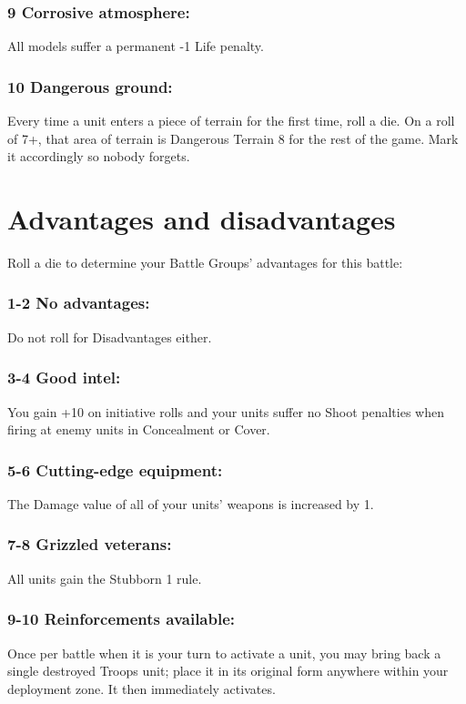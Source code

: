 \begin{multicols}{2}
\subsubsection*{9 Corrosive atmosphere:} All models suffer a permanent -1 Life penalty.

\subsubsection*{10 Dangerous ground:} Every time a unit enters a piece of terrain for the first time, roll a die. On a roll of 7+, that area of terrain is Dangerous Terrain 8 for the rest of the game. Mark it accordingly so nobody forgets.




\section*{Advantages and disadvantages}
Roll a die to determine your Battle Groups' advantages for this battle:
\subsubsection*{1-2 No advantages:} Do not roll for Disadvantages either.

\subsubsection*{3-4 Good intel:} You gain +10 on initiative rolls and your units suffer no Shoot penalties when firing at enemy units in Concealment or Cover.

\subsubsection*{5-6 Cutting-edge equipment:} The Damage value of all of your units' weapons is increased by 1.

\subsubsection*{7-8 Grizzled veterans:} All units gain the Stubborn 1 rule.

\subsubsection*{9-10 Reinforcements available:} Once per battle when it is your turn to activate a unit, you may bring back a single destroyed Troops unit; place it in its original form anywhere within your deployment zone. It then immediately activates.


\end{multicols}
